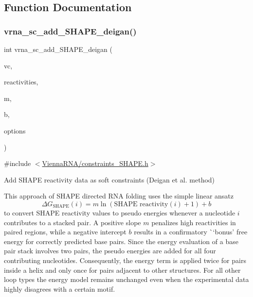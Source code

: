 \subsection{Function Documentation}
\mbox{\label{group___s_h_a_p_e__reactivities_ga57d612b58e1c61dd6cfcb5a843f8f1b3}} 
\subsubsection{\texorpdfstring{vrna\+\_\+sc\+\_\+add\+\_\+\+S\+H\+A\+P\+E\+\_\+deigan()}{vrna\_sc\_add\_SHAPE\_deigan()}}
{\footnotesize\ttfamily int vrna\+\_\+sc\+\_\+add\+\_\+\+S\+H\+A\+P\+E\+\_\+deigan (\begin{DoxyParamCaption}\item[{\mbox{\hyperlink{group__fold__compound_ga1b0cef17fd40466cef5968eaeeff6166}{vrna\+\_\+fold\+\_\+compound\+\_\+t}} $\ast$}]{vc,  }\item[{const double $\ast$}]{reactivities,  }\item[{double}]{m,  }\item[{double}]{b,  }\item[{unsigned int}]{options }\end{DoxyParamCaption})}



{\ttfamily \#include $<$\mbox{\hyperlink{constraints___s_h_a_p_e_8h}{Vienna\+R\+N\+A/constraints\+\_\+\+S\+H\+A\+P\+E.\+h}}$>$}



Add S\+H\+A\+PE reactivity data as soft constraints (Deigan et al. method) 

This approach of S\+H\+A\+PE directed R\+NA folding uses the simple linear ansatz \[ \Delta G_{\text{SHAPE}}(i) = m \ln(\text{SHAPE reactivity}(i)+1)+ b \] to convert S\+H\+A\+PE reactivity values to pseudo energies whenever a nucleotide $ i $ contributes to a stacked pair. A positive slope $ m $ penalizes high reactivities in paired regions, while a negative intercept $ b $ results in a confirmatory \`{}`bonus'\textquotesingle{} free energy for correctly predicted base pairs. Since the energy evaluation of a base pair stack involves two pairs, the pseudo energies are added for all four contributing nucleotides. Consequently, the energy term is applied twice for pairs inside a helix and only once for pairs adjacent to other structures. For all other loop types the energy model remains unchanged even when the experimental data highly disagrees with a certain motif.

